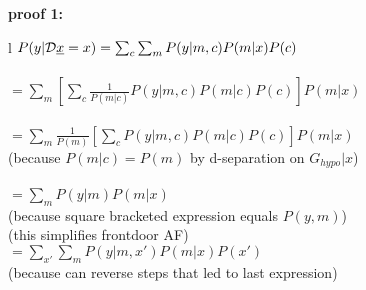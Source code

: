 \begin{claim}
\label{cl-decFrontDoor}
\decFrontDoor
\end{claim}

\proof


{\bf * proof 1:}

\begin{longtable}{l}
$P(y|\cald\rvx=x) =\sum_c\sum_m P(y|m,c)P(m|x)P(c)$
\\
\hspace{2cm}
\\
\quad$=\sum_m \left[\sum_c\frac{1}{P(m|c)} P(y|m,c)P(m|c)P(c)\right]P(m|x)$
\\
\hspace{2cm}
\\
\quad$=\sum_m \frac{1}{P(m)}\left[\sum_c P(y|m,c)P(m|c)P(c)\right]P(m|x)$ \\
\hspace{2cm}(because $P(m|c)=P(m)$ by d-separation
on $G_{hypo}|x$)
\\
\hspace{2cm}
\\
\quad$=\sum_m P(y|m)P(m|x)$ 
\\
\hspace{2cm}
(because square bracketed expression equals $P(y,m)$)
\\
\hspace{2cm}
\quad (this simplifies frontdoor AF)
\\
\quad
$=\sum_{x'}\sum_m P(y|m,x')P(m|x)P(x')$
\\
\hspace{2cm}
(because can reverse steps that led to last expression)
\\
\hspace{2cm}
\end{longtable}

